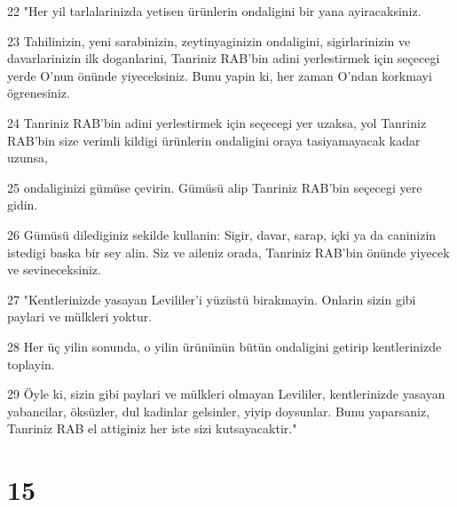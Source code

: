 \par 22 "Her yil tarlalarinizda yetisen ürünlerin ondaligini bir yana ayiracaksiniz.
\par 23 Tahilinizin, yeni sarabinizin, zeytinyaginizin ondaligini, sigirlarinizin ve davarlarinizin ilk doganlarini, Tanriniz RAB'bin adini yerlestirmek için seçecegi yerde O'nun önünde yiyeceksiniz. Bunu yapin ki, her zaman O'ndan korkmayi ögrenesiniz.
\par 24 Tanriniz RAB'bin adini yerlestirmek için seçecegi yer uzaksa, yol Tanriniz RAB'bin size verimli kildigi ürünlerin ondaligini oraya tasiyamayacak kadar uzunsa,
\par 25 ondaliginizi gümüse çevirin. Gümüsü alip Tanriniz RAB'bin seçecegi yere gidin.
\par 26 Gümüsü dilediginiz sekilde kullanin: Sigir, davar, sarap, içki ya da caninizin istedigi baska bir sey alin. Siz ve aileniz orada, Tanriniz RAB'bin önünde yiyecek ve sevineceksiniz.
\par 27 "Kentlerinizde yasayan Levililer'i yüzüstü birakmayin. Onlarin sizin gibi paylari ve mülkleri yoktur.
\par 28 Her üç yilin sonunda, o yilin ürününün bütün ondaligini getirip kentlerinizde toplayin.
\par 29 Öyle ki, sizin gibi paylari ve mülkleri olmayan Levililer, kentlerinizde yasayan yabancilar, öksüzler, dul kadinlar gelsinler, yiyip doysunlar. Bunu yaparsaniz, Tanriniz RAB el attiginiz her iste sizi kutsayacaktir."

\chapter{15}

